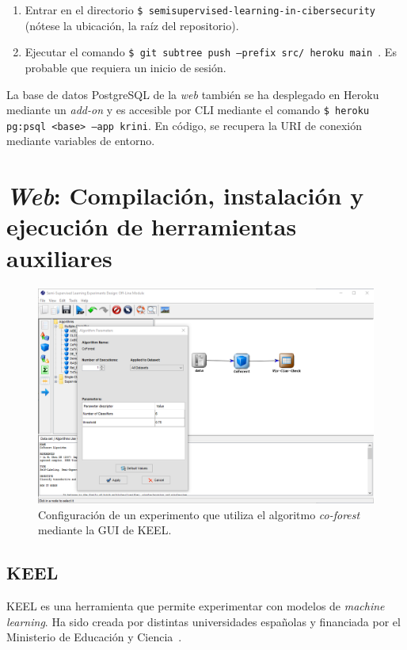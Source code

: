 \begin{enumerate}
	\item Entrar en el directorio \texttt{\$ semisupervised-learning-in-cibersecurity} (nótese la ubicación, la raíz del repositorio).
	\item Ejecutar el comando \texttt{\$ git subtree push --prefix src/ heroku main
	}. Es probable que requiera un inicio de sesión.
\end{enumerate}

La base de datos PostgreSQL de la \textit{web} también se ha desplegado en Heroku mediante un \textit{add-on} y es accesible por CLI mediante el comando \texttt{\$
heroku pg:psql <base> --app krini}. En código, se recupera la URI de conexión mediante variables de entorno.

\section{\textit{Web}: Compilación, instalación y ejecución de herramientas auxiliares}

\begin{figure}[h]
	\caption[\textit{Co-forest}: Configuración de un experimento en KEEL]{Configuración de un experimento que utiliza el algoritmo \textit{co-forest} mediante la GUI de KEEL.}
	\centering
	\includegraphics[scale=0.5]{../img/anexos/manual/keel_gui.png}
\end{figure}

\subsection{KEEL}

KEEL es una herramienta que permite experimentar con modelos de \textit{machine learning}. Ha sido creada por distintas universidades españolas y financiada por el Ministerio de Educación y Ciencia~\cite{KEEL}.

